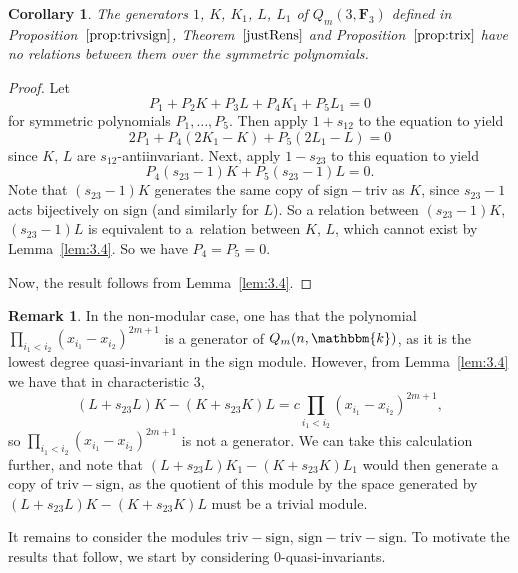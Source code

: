 \documentclass[11pt]{article}
\numberwithin{equation}{section}
\newtheorem{Corollary}[Theorem]{Corollary}
\theoremstyle{definition}
\newtheorem{Remark}[Theorem]{Remark}
\numberwithin{equation}{section}
\renewcommand{\k}{\mathbbm{k}}
\newcommand{\sign}{\mathrm{sign}}
\newcommand{\six}{\mathrm{sign-triv-sign}}
\newcommand{\siv}{\mathrm{sign-triv}}
\newcommand{\tign}{\mathrm{triv-sign}}
\begin{document}
 \begin{Corollary}\label{cor:5gens}
 The generators $1$, $K$, $K_1$, $L$, $L_1$ of $Q_m(3,\mathbf{F}_3)$ defined in Proposition~$\ref{prop:trivsign}$, Theorem~$\ref{justRens}$ and Proposition~$\ref{prop:trix}$ have no relations between them over the symmetric polynomials.
 \end{Corollary}

 \begin{proof}
 Let
 \[P_1+P_2K+P_3L+P_4K_1+P_5L_1=0\]
 for symmetric polynomials $P_1,\dots,P_5$. Then apply $1+s_{12}$ to the equation to yield
 \[2P_1+P_4(2K_1-K)+P_5(2L_1-L)=0\]
 since $K$, $L$ are $s_{12}$-antiinvariant. Next, apply $1-s_{23}$ to this equation to yield
 \[P_4(s_{23}-1)K+P_5(s_{23}-1)L=0.\]
 Note that $(s_{23}-1)K$ generates the same copy of $\siv$ as $K$, since $s_{23}-1$ acts bijectively on $\sign$ (and similarly for $L$). So a relation between $(s_{23}-1)K$, $(s_{23}-1)L$ is equivalent to a~relation between $K$, $L$, which cannot exist by Lemma~\ref{lem:3.4}. So we have $P_4=P_5=0$.

 Now, the result follows from Lemma~\ref{lem:3.4}.
 \end{proof}

 \begin{Remark}\label{rem:sign}
 In the non-modular case, one has that the polynomial $\prod_{i_1<i_2}(x_{i_1}-x_{i_2})^{2m+1}$ is a generator of $Q_m(n,\k)$, as it is the lowest degree quasi-invariant in the sign module. However, from Lemma~\ref{lem:3.4} we have that in characteristic 3,
 \[(L+s_{23}L)K-(K+s_{23}K)L=c\prod_{i_1<i_2}(x_{i_1}-x_{i_2})^{2m+1},\]
 so $\prod_{i_1<i_2}(x_{i_1}-x_{i_2})^{2m+1}$ is not a generator. We can take this calculation further, and note that $(L+s_{23}L)K_1-(K+s_{23}K)L_1$ would then generate a copy of $\tign$, as the quotient of this module by the space generated by $(L+s_{23}L)K-(K+s_{23}K)L$ must be a trivial module.
 \end{Remark}

 It remains to consider the modules $\tign$, $\six$. To motivate the results that follow, we start by considering 0-quasi-invariants.
\end{document}
